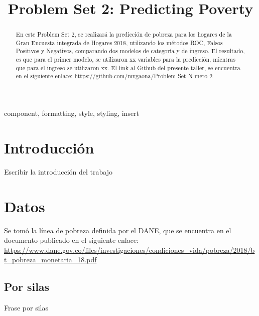 \documentclass[conference, 10pt]{IEEEtran}
\begin{document}
\title{Problem Set 2: Predicting Poverty\\}

\author{
\and
{}
}

\maketitle

\begin{abstract}
En este Problem Set 2, se realizará la predicción de pobreza para los hogares de la Gran Encuesta integrada de Hogares 2018, utilizando
los métodos ROC, Falsos Positivos y Negativos, comparando dos modelos de categoría y de ingreso. El resultado, es que para el primer modelo, se utilizaron xx variables para la predicción, mientras que para el ingreso se utilizaron xx. El link al Github del presente taller, se encuentra en el siguiente enlace: \url{https://github.com/mvgaona/Problem-Set-N-mero-2}\\

\end{abstract}

\begin{IEEEkeywords}
component, formatting, style, styling, insert
\end{IEEEkeywords}

\section{Introducción}
Escribir la introducción del trabajo

\section{Datos}
Se tomó la línea de pobreza definida por el DANE, que se encuentra en el documento publicado en el siguiente enlace: \url{https://www.dane.gov.co/files/investigaciones/condiciones_vida/pobreza/2018/bt_pobreza_monetaria_18.pdf}\\ 
\subsection{Por silas}

Frase por silas
\end{document}
